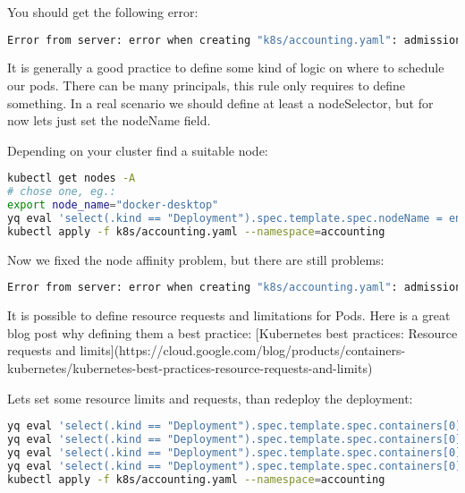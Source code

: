 You should get the following error:

\begin{lstlisting}[caption={TODO},language=bash,label=code:todo]
Error from server: error when creating "k8s/accounting.yaml": admission webhook "node-affinity.btieger.me" denied the request: Deployment must have some kind of node affinity! (affinity, nodeSelector, nodeName)
\end{lstlisting}

It is generally a good practice to define some kind of logic on where to schedule our pods. There can be many principals, this rule only requires to define something. In a real scenario we should define at least a nodeSelector, but for now lets just set the nodeName field.

Depending on your cluster find a suitable node:

\begin{lstlisting}[caption={TODO},language=bash,label=code:bashx]
kubectl get nodes -A
# chose one, eg.:
export node_name="docker-desktop"
yq eval 'select(.kind == "Deployment").spec.template.spec.nodeName = env(node_name)' k8s/accounting.yaml -i
kubectl apply -f k8s/accounting.yaml --namespace=accounting
\end{lstlisting}

Now we fixed the node affinity problem, but there are still problems:

\begin{lstlisting}[caption={TODO},language=bash,label=code:todo]
Error from server: error when creating "k8s/accounting.yaml": admission webhook "deny-no-resources.btieger.me" denied the request: Deployment must have resource definitions!
\end{lstlisting}

It is possible to define resource requests and limitations for Pods. Here is a great blog post why defining them a best practice: [Kubernetes best practices: Resource requests and limits](https://cloud.google.com/blog/products/containers-kubernetes/kubernetes-best-practices-resource-requests-and-limits)

Lets set some resource limits and requests, than redeploy the deployment:

\begin{lstlisting}[caption={TODO},language=bash,label=code:bashx]
yq eval 'select(.kind == "Deployment").spec.template.spec.containers[0].resources.limits.cpu = "500m"' k8s/accounting.yaml -i
yq eval 'select(.kind == "Deployment").spec.template.spec.containers[0].resources.limits.memory = "128Mi"' k8s/accounting.yaml -i
yq eval 'select(.kind == "Deployment").spec.template.spec.containers[0].resources.requests.cpu = "500m"' k8s/accounting.yaml -i
yq eval 'select(.kind == "Deployment").spec.template.spec.containers[0].resources.requests.memory = "128Mi"' k8s/accounting.yaml -i
kubectl apply -f k8s/accounting.yaml --namespace=accounting
\end{lstlisting}

